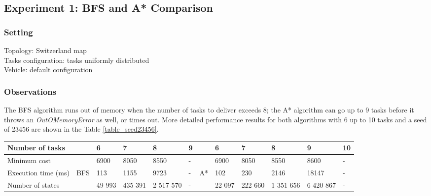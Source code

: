 \documentclass[10pt]{article}
\begin{document}
\subsection{Experiment 1: BFS and A* Comparison}

\subsubsection{Setting}
Topology: Switzerland map\\
Tasks configuration: tasks uniformly distributed\\
Vehicle: default configuration

\subsubsection{Observations}
The BFS algorithm runs out of memory when the number of tasks to deliver exceeds 8; the A* algorithm can go up to 9 tasks before it throws an \textit{OutOMemoryError} as well, or times out.
More detailed performance results for both algorithms with 6 up to 10 tasks and a seed of 23456 are shown in the Table \ref{table_seed23456}.\\

\begin{adjustwidth}{0cm}{}
\begin{tabular}{|l|lllll|llllll|}
\hline
Number of tasks & & 6 & 7 & 8 & 9 & & 6 & 7 & 8 & 9 & 10\\
\hline
Minimum cost & & 6900 & 8050 & 8550 & - & & 6900 & 8050 & 8550 & 8600 & -\\
Execution time (ms) & BFS & 113 & 1155 & 9723 & - & A* & 102 & 230 & 2146 & 18147 & -\\
Number of states & & 49 993 & 435 391 & 2 517 570 & - & & 22 097 & 222 660 & 1 351 656 & 6 420 867 & -\\
\hline
\end{tabular}
\label{table_seed23456}
\end{adjustwidth}
\vspace{4mm}
\end{document}
